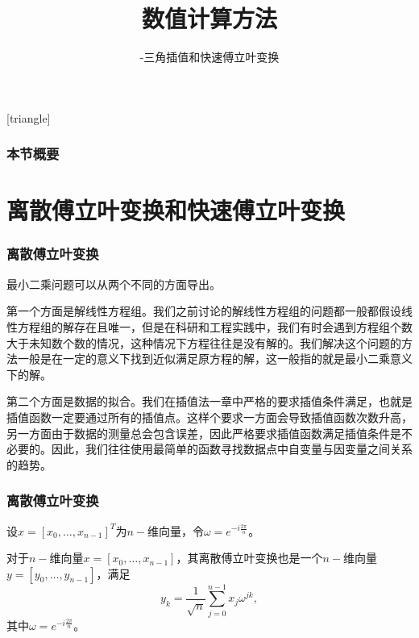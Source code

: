 \documentclass[10pt]{beamer}
\title[数值计算方法]{数值计算方法}
\subtitle{-三角插值和快速傅立叶变换}
\begin{document}
[triangle]

\begin{frame}
\titlepage
\end{frame}


\begin{frame}
  \frametitle{本节概要}
  \tableofcontents%
\end{frame}

\section{离散傅立叶变换和快速傅立叶变换}

\begin{frame}
\frametitle{离散傅立叶变换}
最小二乘问题可以从两个不同的方面导出。

\vspace{0.2cm}

第一个方面是解线性方程组。我们之前讨论的解线性方程组的问题都一般都假设线性方程组的解存在且唯一，但是在科研和工程实践中，我们有时会遇到方程组个数大于未知数个数的情况，这种情况下方程往往是没有解的。我们解决这个问题的方法一般是在一定的意义下找到近似满足原方程的解，这一般指的就是最小二乘意义下的解。

\vspace{0.2cm}

第二个方面是数据的拟合。我们在插值法一章中严格的要求插值条件满足，也就是插值函数一定要通过所有的插值点。这样个要求一方面会导致插值函数次数升高，另一方面由于数据的测量总会包含误差，因此严格要求插值函数满足插值条件是不必要的。因此，我们往往使用最简单的函数寻找数据点中自变量与因变量之间关系的趋势。

\vspace{0.2cm}
\end{frame}


\begin{frame}
\frametitle{离散傅立叶变换}
设$x = [x_0, \ldots, x_{n-1}]^T$为$n-$维向量，令$\omega = e^{-i \frac{2\pi}{n}}$。
\begin{definition}[离散傅立叶变换]
对于$n-$维向量$x = [x_0, \ldots, x_{n-1}]$，其离散傅立叶变换也是一个$n-$维向量$y = [y_0, \ldots, y_{n-1}]$，满足
\begin{equation}
\label{eq: DFT original}
y_k = \frac{1}{\sqrt{n}} \sum_{j = 0}^{n-1} x_j \omega^{jk},
\end{equation}
其中$\omega = e^{-i \frac{2\pi}{n}}$。
\end{definition}
\end{frame}
\end{document}
